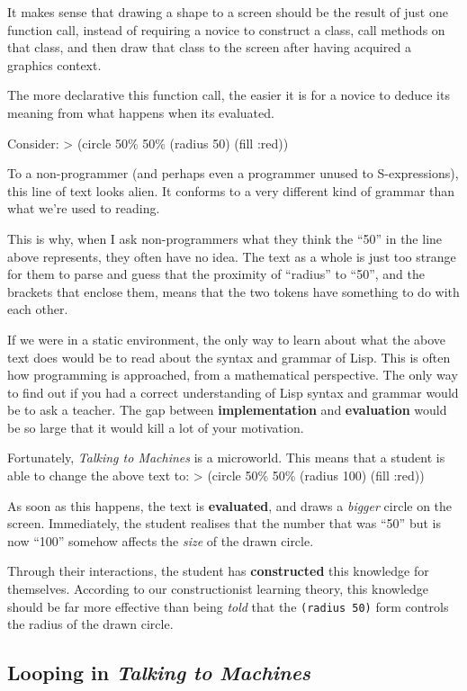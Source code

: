 It makes sense that drawing a shape to a screen should be the result of
just one function call, instead of requiring a novice to construct a
class, call methods on that class, and then draw that class to the
screen after having acquired a graphics context.

The more declarative this function call, the easier it is for a novice
to deduce its meaning from what happens when its evaluated.

Consider: \textgreater{} (circle 50\% 50\% (radius 50) (fill :red))

To a non-programmer (and perhaps even a programmer unused to
S-expressions), this line of text looks alien. It conforms to a very
different kind of grammar than what we're used to reading.

This is why, when I ask non-programmers what they think the ``50'' in
the line above represents, they often have no idea. The text as a whole
is just too strange for them to parse and guess that the proximity of
``radius'' to ``50'', and the brackets that enclose them, means that the
two tokens have something to do with each other.

If we were in a static environment, the only way to learn about what the
above text does would be to read about the syntax and grammar of Lisp.
This is often how programming is approached, from a mathematical
perspective. The only way to find out if you had a correct understanding
of Lisp syntax and grammar would be to ask a teacher. The gap between
\textbf{implementation} and \textbf{evaluation} would be so large that
it would kill a lot of your motivation.

Fortunately, \emph{Talking to Machines} is a microworld. This means that
a student is able to change the above text to: \textgreater{} (circle
50\% 50\% (radius 100) (fill :red))

As soon as this happens, the text is \textbf{evaluated}, and draws a
\emph{bigger} circle on the screen. Immediately, the student realises
that the number that was ``50'' but is now ``100'' somehow affects the
\emph{size} of the drawn circle.

Through their interactions, the student has \textbf{constructed} this
knowledge for themselves. According to our constructionist learning
theory, this knowledge should be far more effective than being
\emph{told} that the \texttt{(radius 50)} form controls the radius of
the drawn circle.

\subsection{Looping in \emph{Talking to Machines}}

